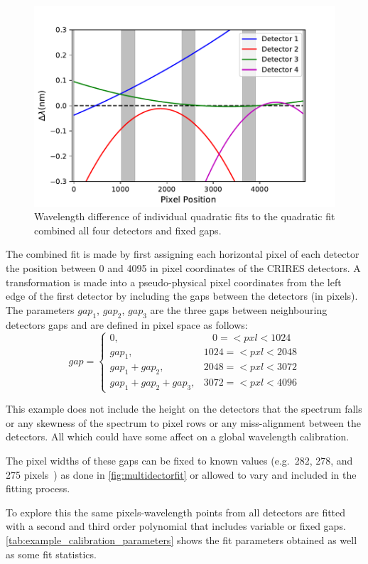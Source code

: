 \begin{figure}
    \centering
    \includegraphics[width=0.7\linewidth]{./figures/appendix/difference_combined_wav_fit}
    \caption[Difference of multi-detector combined fit to the individual calibration mappings.]{Wavelength difference of individual quadratic fits to the quadratic fit combined all four detectors and fixed gaps.}
    \label{fig:multidectorfitdiff}
\end{figure}

The combined fit is made by first assigning each horizontal pixel of each detector the position between 0 and 4095 in pixel coordinates of the {CRIRES} detectors.
A transformation is made into a pseudo-physical pixel coordinates from the left edge of the first detector by including the gaps between the detectors (in pixels).
The parameters \(gap_{1}\), \(gap_{2}\), \(gap_{3}\) are the three gaps between neighbouring detectors gaps and are defined in pixel space as follows:
\[
gap =\begin{cases}
0,                       & ~~~~0=<pxl<1024\\
gap_1,                    & 1024=<pxl<2048\\
gap_1 + gap_2,             & 2048=<pxl<3072\\
gap_1 + gap_2 + gap_3,      & 3072=<pxl<4096
\end{cases}
\]


This example does not include the height on the detectors that the spectrum falls or any skewness of the spectrum to pixel rows or any miss-alignment between the detectors.
All which could have some affect on a global wavelength calibration.

The pixel widths of these gaps can be fixed to known values (e.g.\ 282, 278, and 275 pixels~\citep{brogi_rotation_2016}) as done in \cref{fig:multidectorfit} or allowed to vary and included in the fitting process.

To explore this the same pixels-wavelength points from all detectors are fitted with a second and third order polynomial that includes variable or fixed gaps.
\cref{tab:example_calibration_parameters} shows the fit parameters obtained as well as some fit statistics.


